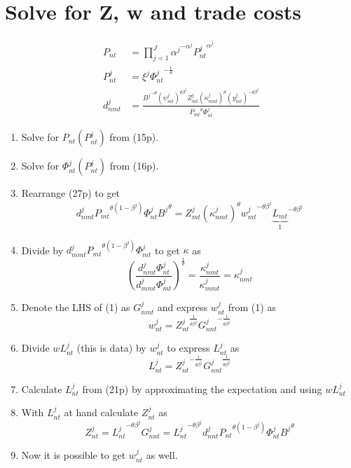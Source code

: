 \documentclass[12pt,oneside,a4paper]{article}
\begin{document}
\section{Solve for Z, w and trade costs} %
\label{sec:solve_for_z_w_and_trade_cost}

\begin{align}
P_{nt} &= \prod_{j = 1}^J {\alpha^j}^{- \alpha^j} {P_{nt}^j}^{\alpha^j} \tag{15p}\\
%
P_{nt}^j &= \xi^j {\Phi_{nt}^j}^{-\frac{1}{\theta}} \tag{16p}\\
%
d^j_{nmt} &= \frac{{B^{j}}^{-\theta} \left(\psi^j_{mt}\right)^{\theta\beta^j} Z_{mt}^j \left(\kappa^j_{nmt}\right)^{\theta} \left(y^j_{mt}\right)^{-\theta\beta^j}}{{P_{mt}}^\theta {\Phi_{nt}^j}} \tag{27p}
\end{align}

\begin{enumerate}
	\item Solve for $P_{nt}(P^j_{nt})$ from (15p).
	\item Solve for $\Phi^j_{nt}(P^j_{nt})$ from (16p).
	\item Rearrange (27p) to get
	\begin{equation}
	d^j_{nmt} {P_{mt}}^{\theta(1 - \beta^j)} {\Phi_{nt}^j} {B^{j}}^{\theta}  = Z_{mt}^j \left(\kappa^j_{nmt}\right)^{\theta} {w^j_{mt}}^{-\theta\beta^j} {\underbrace{L_{mt}}_{1}}^{-\theta\beta^j}	
	\end{equation}
	\item Divide by $d^j_{mmt} {P_{mt}}^{\theta(1 - \beta^j)} {\Phi_{mt}^j}$ to get  $\kappa$ as
	\begin{equation}
		\left(\frac{d^j_{nmt} {\Phi_{nt}^j}}{d^j_{mmt} {\Phi_{mt}^j}}\right)^{\frac{1}{\theta}} =
	  \frac{\kappa^j_{nmt}}{\kappa^j_{mmt}} = \kappa^j_{nmt}
	\end{equation}
	\item Denote the LHS of (1) as $G_{nmt}^j$ and express $w_{nt}^j$ from (1) as
	\begin{equation}
		w_{nt}^j = {Z_{nt}^j}^{\frac{1}{\theta\beta^j}} {G_{nnt}^j}^{-\frac{1}{\theta\beta^j}}
	\end{equation}
	\item Divide $wL_{nt}^j$ (this is data) by $w_{nt}^j$ to express $L_{nt}^j$ as
	\begin{equation}
		L_{nt}^j = {Z_{nt}^j}^{-\frac{1}{\theta\beta^j}} {G_{nnt}^j}^{\frac{1}{\theta\beta^j}}
	\end{equation}
	\item Calculate $L_{nt}^j$ from (21p) by approximating the expectation and using $wL_{nt}^j$
	\item With $L_{nt}^j$ at hand calculate $Z_{nt}^j$ as
	\begin{equation}
		Z_{nt}^j = {L_{nt}^j}^{-\theta\beta^j} G_{nnt}^j = {L_{nt}^j}^{-\theta\beta^j} d^j_{nnt} {P_{nt}}^{\theta(1 - \beta^j)} {\Phi_{nt}^j} {B^{j}}^{\theta} 
	\end{equation}
	\item Now it is possible to get $w_{nt}^j$ as well.
\end{enumerate}



\end{document}
